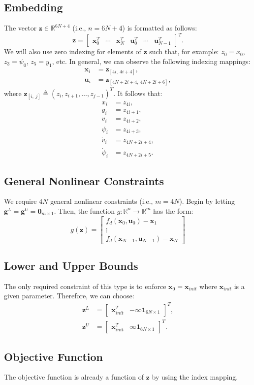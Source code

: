 \documentclass[12pt, letterpaper]{report}
\newcommand{\vect}[1]{\boldsymbol{\mathbf{#1}}}
\newcommand{\mat}[1]{\begin{bmatrix} #1 \end{bmatrix}}
\begin{document}
\subsection*{Embedding}
The vector $\vect{z} \in \mathbb{R}^{6N+4}$ (i.e., $n=6N+4$) is formatted as follows:
\begin{equation}
  \vect{z} = \mat{\vect{x}_0^T & \cdots & \vect{x}_{N}^T & \vect{u}_0^T
  & \cdots & \vect{u}_{N-1}^T}^T. 
\end{equation}
We will also use zero indexing for elements of $\vect{z}$ such that, for
example: $z_0 = x_0$, $z_3 = \psi_0$, $z_5 = y_1$, etc. In general, we
can observe the following indexing mappings:
\begin{subequations}
\begin{align}
  \vect{x}_i &= \vect{z}_{[4i,\ 4i + 4]},\\
  \vect{u}_i &= \vect{z}_{[4N + 2i + 4,\ 4N + 2i + 6]},
\end{align}
\end{subequations}
where $\vect{z}_{[i,\ j]} \triangleq (z_i, z_{i+1}, \ldots, z_{j-1})^T$.
It follows that:
\begin{subequations}
  \begin{align}
    x_i &= z_{4i},\\
    y_i &= z_{4i+1},\\
    v_i &= z_{4i+2},\\
    \psi_i &= z_{4i+3},\\
    \dot{v}_i &= z_{4N+2i+4},\\
    \dot{\psi}_i &= z_{4N+2i+5}.
  \end{align}
\end{subequations}
\subsection*{General Nonlinear Constraints}
We require $4N$ general nonlinear constraints (i.e., $m=4N$). Begin by
letting $\vect{g}^L = \vect{g}^U = \vect{0}_{m\times 1}$. Then, the
function $g:\mathbb{R}^{n}\rightarrow \mathbb{R}^m$ has the form:
\begin{equation}
  g(\vect{z}) = \mat{f_d(\vect{x}_0,\vect{u}_0) - \vect{x}_1 \\
  \vdots \\ f_d(\vect{x}_{N-1},\vect{u}_{N-1}) - \vect{x}_N}
\end{equation}

\subsection*{Lower and Upper Bounds}
The only required constraint of this type is to enforce $\vect{x}_0 =
\vect{x}_{init}$ where $\vect{x}_{init}$ is a given parameter.
Therefore, we can choose:
\begin{subequations}
  \begin{align}
    \vect{z}^L &= \mat{\vect{x}_{init}^T & -\infty\vect{1}_{6N\times
    1}}^T,\\
    \vect{z}^U &= \mat{\vect{x}_{init}^T & \infty\vect{1}_{6N\times
    1}}^T.
  \end{align}
\end{subequations}

\subsection*{Objective Function}
The objective function is already a function of $\vect{z}$ by using the
index mapping.


\end{document}
